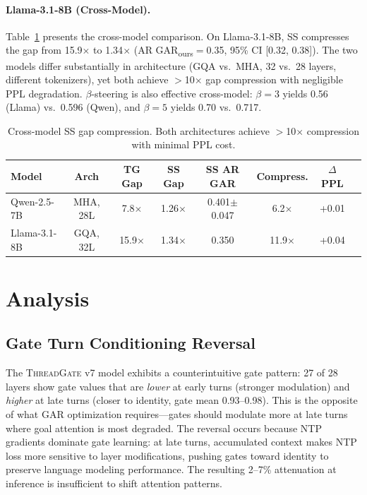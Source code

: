 \documentclass[11pt]{article}
\newcommand{\gar}{\textsc{GAR}}
\newcommand{\garours}{\textsc{GAR}\textsubscript{ours}}
\newcommand{\tg}{\textsc{ThreadGate}}
\begin{document}
\paragraph{Llama-3.1-8B (Cross-Model).} Table~\ref{tab:cross_model} presents the cross-model comparison. On Llama-3.1-8B, SS compresses the gap from 15.9$\times$ to 1.34$\times$ (AR \garours{}$=$0.35, 95\% CI [0.32, 0.38]). The two models differ substantially in architecture (GQA vs.\ MHA, 32 vs.\ 28 layers, different tokenizers), yet both achieve $>$10$\times$ gap compression with negligible PPL degradation. $\beta$-steering is also effective cross-model: $\beta=3$ yields 0.56 (Llama) vs.\ 0.596 (Qwen), and $\beta=5$ yields 0.70 vs.\ 0.717.

\begin{table}[t]
\centering
\small
\caption{Cross-model SS gap compression. Both architectures achieve $>$10$\times$ compression with minimal PPL cost.}
\label{tab:cross_model}
\begin{tabular}{lccccccc}
\toprule
\textbf{Model} & \textbf{Arch} & \textbf{TG Gap} & \textbf{SS Gap} & \textbf{SS AR \gar{}} & \textbf{Compress.} & \textbf{$\Delta$PPL} \\
\midrule
Qwen-2.5-7B & MHA, 28L & 7.8$\times$ & 1.26$\times$ & 0.401$\pm$0.047 & 6.2$\times$ & +0.01 \\
Llama-3.1-8B & GQA, 32L & 15.9$\times$ & 1.34$\times$ & 0.350 & 11.9$\times$ & +0.04 \\
\bottomrule
\end{tabular}
\end{table}

\section{Analysis}

\subsection{Gate Turn Conditioning Reversal}

The \tg{} v7 model exhibits a counterintuitive gate pattern: 27 of 28 layers show gate values that are \emph{lower} at early turns (stronger modulation) and \emph{higher} at late turns (closer to identity, gate mean 0.93--0.98). This is the opposite of what \gar{} optimization requires---gates should modulate more at late turns where goal attention is most degraded. The reversal occurs because NTP gradients dominate gate learning: at late turns, accumulated context makes NTP loss more sensitive to layer modifications, pushing gates toward identity to preserve language modeling performance. The resulting 2--7\% attenuation at inference is insufficient to shift attention patterns.
\end{document}
